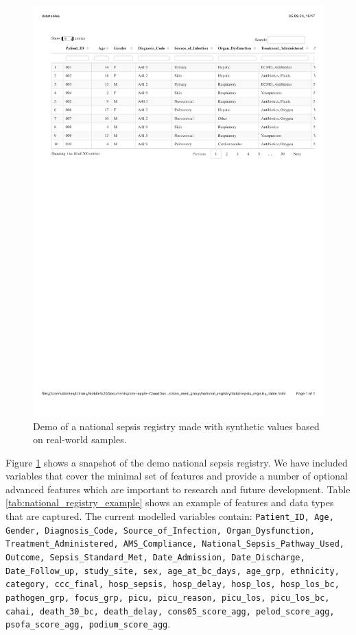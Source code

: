 \begin{figure}[h] \hspace*{0cm} 
\begin{center}
	\includegraphics[width=1\textwidth]{../national_registry/data/registry_snapshot.pdf}
	\caption{Demo of a national sepsis registry made with synthetic values based on real-world samples.}
	\label{fig:national_registry_snapshot}
\end{center}
\end{figure}

Figure 
\ref{fig:national_registry_snapshot} shows a snapshot of the demo national sepsis registry.
We have included variables that cover the minimal set of features and provide a number of optional advanced features which are important to research and future development. 
Table 
\ref{tab:national_registry_example} 
shows an example of features and data types that are captured.
The current modelled variables contain:
\texttt{Patient\_ID, Age, Gender, Diagnosis\_Code, Source\_of\_Infection, Organ\_Dysfunction, Treatment\_Administered, AMS\_Compliance, National\_Sepsis\_Pathway\_Used, Outcome, Sepsis\_Standard\_Met, Date\_Admission, Date\_Discharge, Date\_Follow\_up, study\_site, sex, age\_at\_bc\_days, age\_grp, ethnicity, category, ccc\_final, hosp\_sepsis, hosp\_delay, hosp\_los, hosp\_los\_bc, pathogen\_grp, focus\_grp, picu, picu\_reason, picu\_los, picu\_los\_bc, cahai, death\_30\_bc, death\_delay, cons05\_score\_agg, pelod\_score\_agg, psofa\_score\_agg, podium\_score\_agg}.

